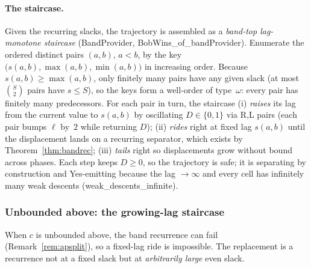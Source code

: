 \documentclass{article}
\newcommand{\us}{\discretionary{}{}{}\_\discretionary{}{}{}}
\newcommand{\lean}[1]{{\small\ttfamily #1}}
\begin{document}
\paragraph{The staircase.}
Given the recurring slacks, the trajectory is assembled as a
\emph{band-top lag-monotone staircase} (\lean{BandProvider},
\lean{BobWins\us of\us bandProvider}). Enumerate the ordered distinct
pairs $(a,b)$, $a<b$, by the key $\bigl(s(a,b),\max(a,b),\min(a,b)\bigr)$
in increasing order. Because $s(a,b)\ge\max(a,b)$, only finitely many
pairs have any given slack (at most $\binom{S}{2}$ pairs have $s\le S$),
so the keys form a well-order of type~$\omega$: every pair has finitely
many predecessors. For each pair in turn, the staircase (i) \emph{raises}
its lag from the current value to $s(a,b)$ by oscillating $D\in\{0,1\}$
via R,L pairs (each pair bumps $\ell$ by~$2$ while returning $D$); (ii)
\emph{rides} right at fixed lag $s(a,b)$ until the displacement lands on a
recurring separator, which exists by Theorem~\ref{thm:bandrec}; (iii)
\emph{tails} right so displacements grow without bound across phases. Each
step keeps $D\ge 0$, so the trajectory is safe; it is separating by
construction and Yes-emitting because the lag $\to\infty$ and every cell
has infinitely many weak descents (\lean{weak\us descents\us infinite}).

\subsubsection{Unbounded above: the growing-lag staircase}
\label{sec:unbounded}

When $c$ is unbounded above, the band recurrence can fail
(Remark~\ref{rem:apsplit}), so a fixed-lag ride is impossible. The
replacement is a recurrence not at a fixed slack but at \emph{arbitrarily
large} even slack.
\end{document}
